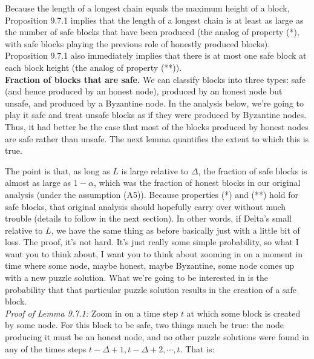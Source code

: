 Because the length of a longest chain equals the maximum height of a block, Proposition 9.7.1 implies that the length of a longest chain is at least as large as the number of safe blocks that have been produced (the analog of property (*), with safe blocks playing the
previous role of honestly produced blocks). Proposition 9.7.1 also immediately implies that
there is at most one safe block at each block height (the analog of property (**)).\\

\noindent
\textbf{Fraction of blocks that are safe.} We can classify blocks into three types: safe (and
hence produced by an honest node), produced by an honest node but unsafe, and produced
by a Byzantine node. In the analysis below, we’re going to play it safe and treat
unsafe blocks as if they were produced by Byzantine nodes. Thus, it had better be the case
that most of the blocks produced by honest nodes are safe rather than unsafe. The next
lemma quantifies the extent to which this is true.

The point is that, as long as $L$ is large relative to $\Delta$, the fraction of safe blocks is almost
as large as $1 - \alpha$, which was the fraction of honest blocks in our original analysis (under
the assumption (A5)). Because properties (*) and (**) hold for safe blocks, that original analysis
should hopefully carry over without much trouble (details to follow in the next section).
In other words, if Delta’s small relative to $L$, we have the same thing as before basically
just with a little bit of loss. The proof, it’s not hard. It’s just really some simple probability,
so what I want you to think about, I want you to think about zooming in on a moment
in time where some node, maybe honest, maybe Byzantine, some node comes up
with a new puzzle solution. What we’re going to be interested in is the probability that that
particular puzzle solution results in the creation of a safe block.\\

\noindent
\textit{Proof of Lemma 9.7.1:} Zoom in on a time step $t$ at which some block is created by some
node. For this block to be safe, two things much be true: the node producing it must
be an honest node, and no other puzzle solutions were found in any of the times steps
$t - \Delta + 1, t - \Delta + 2, \cdots, t$. That is:

